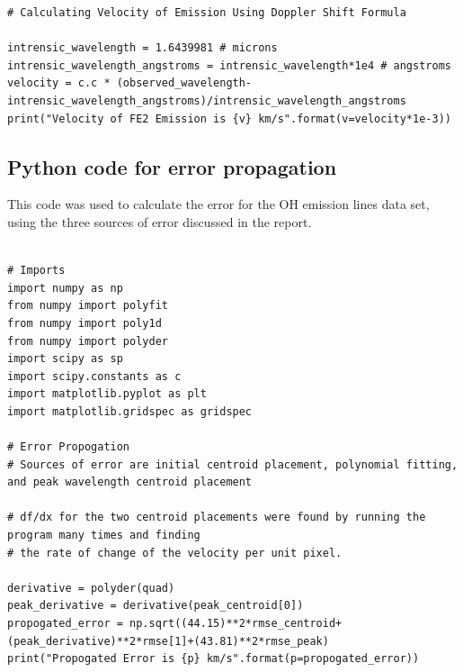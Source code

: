 \documentclass{article}
\begin{document}
\begin{appendices}
\begin{footnotesize}
\begin{verbatim}
# Calculating Velocity of Emission Using Doppler Shift Formula

intrensic_wavelength = 1.6439981 # microns
intrensic_wavelength_angstroms = intrensic_wavelength*1e4 # angstroms
velocity = c.c * (observed_wavelength-intrensic_wavelength_angstroms)/intrensic_wavelength_angstroms
print("Velocity of FE2 Emission is {v} km/s".format(v=velocity*1e-3))
\end{verbatim}
\end{footnotesize}


\label{code:velocity}
\subsection{Python code for error propagation}
\label{code:error}
This code was used to calculate the error for the OH emission lines data set, using the three sources of error discussed in the report. 
\begin{footnotesize}
  \begin{verbatim}

# Imports 
import numpy as np
from numpy import polyfit
from numpy import poly1d
from numpy import polyder
import scipy as sp
import scipy.constants as c
import matplotlib.pyplot as plt
import matplotlib.gridspec as gridspec

# Error Propogation 
# Sources of error are initial centroid placement, polynomial fitting, and peak wavelength centroid placement

# df/dx for the two centroid placements were found by running the program many times and finding 
# the rate of change of the velocity per unit pixel. 

derivative = polyder(quad)
peak_derivative = derivative(peak_centroid[0])
propogated_error = np.sqrt((44.15)**2*rmse_centroid+(peak_derivative)**2*rmse[1]+(43.81)**2*rmse_peak)
print("Propogated Error is {p} km/s".format(p=propogated_error))

  \end{verbatim}
\end{footnotesize}


\end{appendices}
\end{document}
